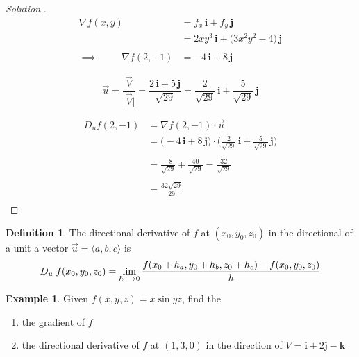 \documentclass[11pt,a4paper]{article}
\theoremstyle{definition}
\newtheorem{defn}[thm]{Definition}
\newtheorem{exa}[thm]{Example}
\newenvironment{solution}
  {\renewcommand{\qedsymbol}{}\begin{proof}[\textit{Solution}.]}
  {\end{proof}}
\begin{document}
\begin{solution}
\begin{align*}
\nabla f (x,y) & = f_x\,\textbf{i}+ f_y\,\textbf{j}\\
& = 2xy^3\,\textbf{i} + \big(3x^2y^2 -4\big)\,\textbf{j}\\\\
\implies \hspace{1cm} \nabla f (2,-1) & = -4\,\textbf{i}+ 8\,\textbf{j}
\end{align*}

$$\overrightarrow{u} = \frac{\overrightarrow{V}}{\big|\overrightarrow{V}\big|} = \frac{2\,\textbf{i} + 5\,\textbf{j}}{\sqrt{29}} = \frac{2}{\sqrt{29}}\,\textbf{i} + \frac{5}{\sqrt{29}}\, \textbf{j}$$

\begin{align*}
D_uf(2,-1) & = \nabla f (2,-1)\cdot\overrightarrow{u}\\
& = \big( - 4\,\textbf{i} + 8\,\textbf{j}\big)\cdot \bigg(\frac{2}{\sqrt{29}}\,\textbf{i} + \frac{5}{\sqrt{29}}\,\textbf{j}\bigg)\\\\
& = \frac{-8}{\sqrt{29}} + \frac{40}{\sqrt{29}}= \frac{32}{\sqrt{29}}\\\\
& = \frac{32\sqrt{29}}{29}\\
\end{align*}
\end{solution}

\begin{defn}


The directional derivative of $f$ at $(x_0,y_0,z_0)$ in the directional of a unit a vector $\overrightarrow{u} = \langle a, b, c\rangle$ is 
$$D_u\hspace{0.1cm}f(x_0,y_0,z_0) = \lim_{h\longrightarrow 0} \frac{f(x_0 + h_a, y_0 + h_b, z_0 + h_c) - f(x_0,y_0,z_0)}{h}$$
\end{defn}


\begin{exa}


Given $f(x,y,z) = x\sin yz$, find the 
\begin{enumerate}
\item the gradient of $f$

\item the directional derivative of $f$  at $(1,3,0)$ in the direction of $V = \textbf{i} + 2\textbf{j} -\textbf{k}$
\end{enumerate}
\end{exa}
\end{document}
